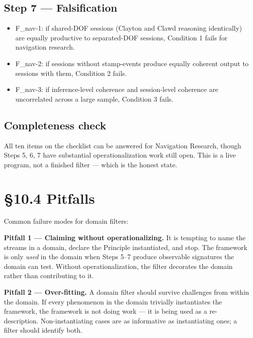 \documentclass[11pt, openany]{book}
\newcommand{\sectionbreak}{\clearpage}
\begin{document}
\subsection{Step 7 --- Falsification}

\begin{itemize}
\item F\_\allowbreak{}nav-1: if shared-DOF sessions (Clayton and Clawd reasoning identically) are equally productive to separated-DOF sessions, Condition 1 fails for navigation research.
\item F\_\allowbreak{}nav-2: if sessions without stamp-events produce equally coherent output to sessions with them, Condition 2 fails.
\item F\_\allowbreak{}nav-3: if inference-level coherence and session-level coherence are uncorrelated across a large sample, Condition 3 fails.
\end{itemize}

\subsection{Completeness check}

All ten items on the checklist can be answered for Navigation Research, though Steps 5, 6, 7 have substantial operationalization work still open. This is a live program, not a finished filter --- which is the honest state.

\sectionbreak

\section{§10.4 Pitfalls}

Common failure modes for domain filters:

\textbf{Pitfall 1 --- Claiming without operationalizing.} It is tempting to name the streams in a domain, declare the Principle instantiated, and stop. The framework is only \textit{used} in the domain when Steps 5–7 produce observable signatures the domain can test. Without operationalization, the filter decorates the domain rather than contributing to it.

\textbf{Pitfall 2 --- Over-fitting.} A domain filter should survive challenges from within the domain. If every phenomenon in the domain trivially instantiates the framework, the framework is not doing work --- it is being used as a re-description. Non-instantiating cases are as informative as instantiating ones; a filter should identify both.
\end{document}
